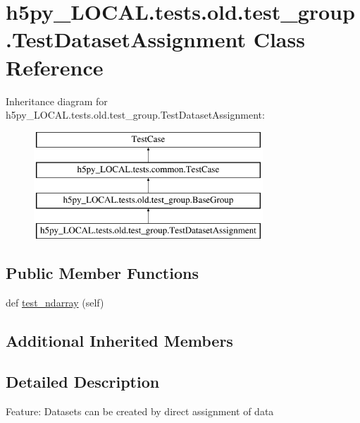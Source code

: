 \hypertarget{classh5py__LOCAL_1_1tests_1_1old_1_1test__group_1_1TestDatasetAssignment}{}\section{h5py\+\_\+\+L\+O\+C\+A\+L.\+tests.\+old.\+test\+\_\+group.\+Test\+Dataset\+Assignment Class Reference}
\label{classh5py__LOCAL_1_1tests_1_1old_1_1test__group_1_1TestDatasetAssignment}
Inheritance diagram for h5py\+\_\+\+L\+O\+C\+A\+L.\+tests.\+old.\+test\+\_\+group.\+Test\+Dataset\+Assignment\+:\begin{figure}[H]
\begin{center}
\leavevmode
\includegraphics[height=4.000000cm]{classh5py__LOCAL_1_1tests_1_1old_1_1test__group_1_1TestDatasetAssignment}
\end{center}
\end{figure}
\subsection*{Public Member Functions}
\begin{DoxyCompactItemize}
\item 
def \hyperlink{classh5py__LOCAL_1_1tests_1_1old_1_1test__group_1_1TestDatasetAssignment_ab5e8ed1f0205f9ece2e036d8fea155c1}{test\+\_\+ndarray} (self)
\end{DoxyCompactItemize}
\subsection*{Additional Inherited Members}


\subsection{Detailed Description}
\begin{DoxyVerb}    Feature: Datasets can be created by direct assignment of data
\end{DoxyVerb}
 

